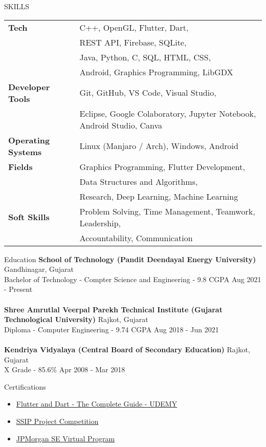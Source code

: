 \documentclass{resume}
\begin{document}
\begin{rSection}{SKILLS}
\begin{tabular}{ @{} >{\bfseries}l @{\hspace{6ex}} l }
Tech 
& C++, OpenGL, Flutter, Dart, \\
& REST API, Firebase, SQLite, \\ 
& Java, Python, C, SQL, HTML, CSS, \\
& Android, Graphics Programming, LibGDX \\

Developer Tools 
& Git, GitHub, VS Code, Visual Studio, \\ 
& Eclipse, Google Colaboratory, Jupyter Notebook, Android Studio, Canva \\

Operating Systems 
& Linux (Manjaro / Arch), Windows, Android \\

Fields 
& Graphics Programming, Flutter Development,\\
& Data Structures and Algorithms, \\ & Research, Deep Learning, Machine Learning\\

Soft Skills 
& Problem Solving, Time Management, Teamwork, Leadership,\\
& Accountability, Communication
\end{tabular}
\end{rSection}


\begin{rSection}{Education}
{\bf School of Technology (Pandit Deendayal Energy University)} \hfill {Gandhinagar, Gujarat}\\
Bachelor of Technology - Compter Science and Engineering - 9.8 CGPA \hfill {Aug 2021 - Present}\\
\\
{\bf Shree Amrutlal Veerpal Parekh Technical Institute (Gujarat Technological University)} \hfill {Rajkot, Gujarat}\\
Diploma - Computer Engineering - 9.74 CGPA \hfill {Aug 2018 - Jun 2021}\\
\\
{\bf Kendriya Vidyalaya (Central Board of Secondary Education)} \hfill {Rajkot, Gujarat}\\
X Grade - 85.6\% \hfill {Apr 2008 - Mar 2018}
\end{rSection}

\begin{rSection}{Certifications} 
\begin{itemize}
    \item   \href{https://www.udemy.com/certificate/UC-2fce7723-1cc7-403d-a54b-09dbd5cd495e/}{Flutter and Dart - The Complete Guide - UDEMY}
    \item   \href{https://jaynakum.github.io/assets/Achievements/SSIP.jpg}{SSIP Project Competition}
    \item   \href{https://jaynakum.github.io/assets/Achievements/JPMC.jpg}{JPMorgan SE Virtual Program}
\end{itemize}
\end{rSection}
\end{document}
